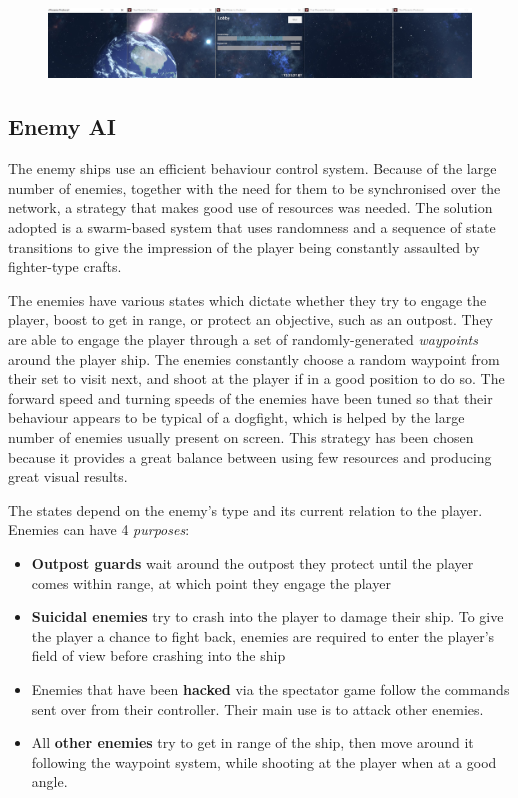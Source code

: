 \documentclass[a4paper,11pt]{article}
\begin{document}
\begin{figure}[ht]
	\centering
	\includegraphics[width=\textwidth]{images/cameras}
    \label{fig:cameras}
\end{figure}

\subsection{Enemy AI}
The enemy ships use an efficient behaviour control system. Because of the large number of enemies, together with the need for them to be synchronised over the network, a strategy that makes good use of resources was needed. The solution adopted is a swarm-based system that uses randomness and a sequence of state transitions to give the impression of the player being constantly assaulted by fighter-type crafts. 

The enemies have various states which dictate whether they try to engage the player, boost to get in range, or protect an objective, such as an outpost. They are able to engage the player through a set of randomly-generated \emph{waypoints} around the player ship. The enemies constantly choose a random waypoint from their set to visit next, and shoot at the player if in a good position to do so. The forward speed and turning speeds of the enemies have been tuned so that their behaviour appears to be typical of a dogfight, which is helped by the large number of enemies usually present on screen. This strategy has been chosen because it provides a great balance between using few resources and producing great visual results.

The states depend on the enemy’s type and its current relation to the player. Enemies can have 4 \emph{purposes}:

\begin{itemize}[noitemsep,topsep=.5ex]
	\item \textbf{Outpost guards} wait around the outpost they protect until the player comes within range, at which point they engage the player
	\item \textbf{Suicidal enemies} try to crash into the player to damage their ship. To give the player a chance to fight back, enemies are required to enter the player’s field of view before crashing into the ship
	\item Enemies that have been \textbf{hacked} via the spectator game follow the commands sent over from their controller. Their main use is to attack other enemies.
	\item All \textbf{other enemies} try to get in range of the ship, then move around it following the waypoint system, while shooting at the player when at a good angle.
\end{itemize}
\end{document}
